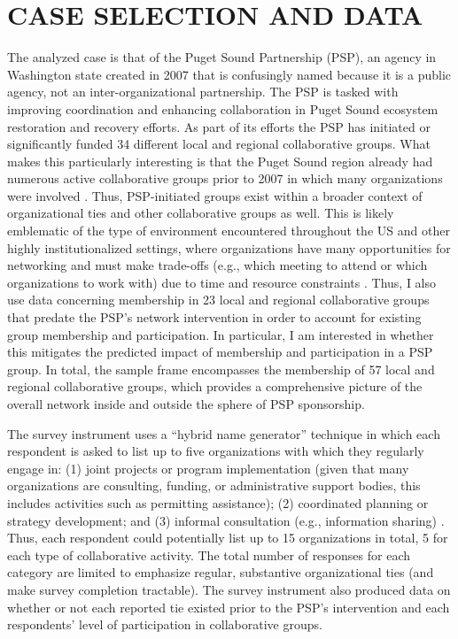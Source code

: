 \documentclass[12pt,a4paper,titlepage]{article}
\begin{document}
\section{\bf\MakeUppercase{Case Selection and Data}}

The analyzed case is that of the Puget Sound Partnership (PSP), an agency in Washington state created in 2007 that is confusingly named because it is a public agency, not an inter-organizational partnership. The PSP is tasked with improving coordination and enhancing collaboration in Puget Sound ecosystem restoration and recovery efforts. As part of its efforts the PSP has initiated or significantly funded 34 different local and regional collaborative groups. What makes this particularly interesting is that the Puget Sound region already had numerous active collaborative groups prior to 2007 in which many organizations were involved \parencite[see][]{scott2015}. Thus, PSP-initiated groups exist within a broader context of organizational ties and other collaborative groups as well. This is likely emblematic of the type of environment encountered throughout the US and other highly institutionalized settings, where organizations have many opportunities for networking and must make trade-offs (e.g., which meeting to attend or which organizations to work with) due to time and resource constraints \parencite{lubell2010}. Thus, I also use data concerning membership in 23 local and regional collaborative groups that predate the PSP’s network intervention in order to account for existing group membership and participation. In particular, I am interested in whether this mitigates the predicted impact of membership and participation in a PSP group. In total, the sample frame encompasses the membership of 57 local and regional collaborative groups, which provides a comprehensive picture of the overall network inside and outside the sphere of PSP sponsorship.

The survey instrument uses a “hybrid name generator” technique \parencite{henry2012,lubell2011-a} in which each respondent is asked to list up to five organizations with which they regularly engage in: (1) joint projects or program implementation (given that many organizations are consulting, funding, or administrative support bodies, this includes activities such as permitting assistance); (2) coordinated planning or strategy development; and (3) informal consultation (e.g., information sharing) \parencite{scott2015}. Thus, each respondent could potentially list up to 15 organizations in total, 5 for each type of collaborative activity. The total number of responses for each category are limited to emphasize regular, substantive organizational ties (and make survey completion tractable). The survey instrument also produced data on whether or not each reported tie existed prior to the PSP’s intervention and each respondents’ level of participation in collaborative groups.
\end{document}
